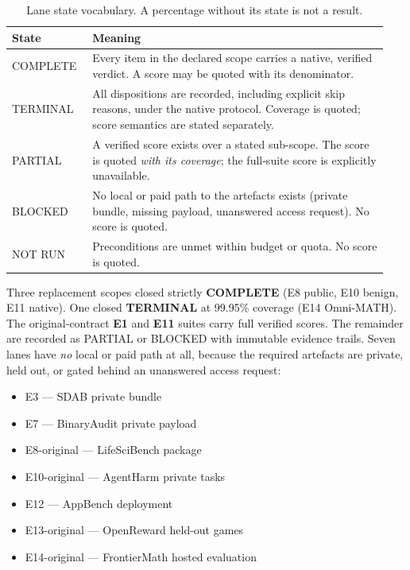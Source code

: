 \begin{table}[h]
  \centering
  \caption{Lane state vocabulary. A percentage without its state is not a
  result.}
  \label{tab:states}
  \small
  \begin{tabular}{@{}L{0.20\linewidth}L{0.74\linewidth}@{}}
    \toprule
    \textbf{State} & \textbf{Meaning} \\
    \midrule
    COMPLETE & Every item in the declared scope carries a native, verified verdict. A score may be quoted with its denominator. \\
    TERMINAL & All dispositions are recorded, including explicit skip reasons, under the native protocol. Coverage is quoted; score semantics are stated separately. \\
    PARTIAL & A verified score exists over a stated sub-scope. The score is quoted \emph{with its coverage}; the full-suite score is explicitly unavailable. \\
    BLOCKED & No local or paid path to the artefacts exists (private bundle, missing payload, unanswered access request). No score is quoted. \\
    NOT RUN & Preconditions are unmet within budget or quota. No score is quoted. \\
    \bottomrule
  \end{tabular}
\end{table}

Three replacement scopes closed strictly \textbf{COMPLETE} (E8 public, E10
benign, E11 native). One closed \textbf{TERMINAL} at 99.95\% coverage (E14
Omni-MATH). The original-contract \textbf{E1} and \textbf{E11} suites carry full
verified scores. The remainder are recorded as PARTIAL or BLOCKED with immutable
evidence trails. Seven lanes have \emph{no} local or paid path at all, because
the required artefacts are private, held out, or gated behind an unanswered
access request:

\begin{itemize}[leftmargin=1.4em,itemsep=2pt]
  \item E3 --- SDAB private bundle
  \item E7 --- BinaryAudit private payload
  \item E8-original --- LifeSciBench package
  \item E10-original --- AgentHarm private tasks
  \item E12 --- AppBench deployment
  \item E13-original --- OpenReward held-out games
  \item E14-original --- FrontierMath hosted evaluation
\end{itemize}

